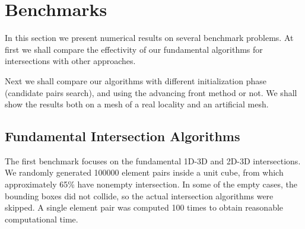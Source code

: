 \documentclass{elsarticle}
\begin{document}
% 





\section{Benchmarks}
\label{sec:benchmarks}
In this section we present numerical results on several benchmark problems. At first we shall compare 
the effectivity of our fundamental algorithms for intersections with other approaches.

Next we shall compare our algorithms with different initialization phase (candidate pairs search),
and using the advancing front method or not. We shall show the results both on a mesh of a real locality
and an artificial mesh.

\subsection{Fundamental Intersection Algorithms}
The first benchmark focuses on the fundamental 1D-3D and 2D-3D intersections. We randomly generated
100000 element pairs inside a unit cube, from which approximately 65\% have nonempty intersection.
In some of the empty cases, the bounding boxes did not collide, so the actual intersection algorithms were skipped. A single element pair was computed 100 times to obtain reasonable computational time.
\end{document}
